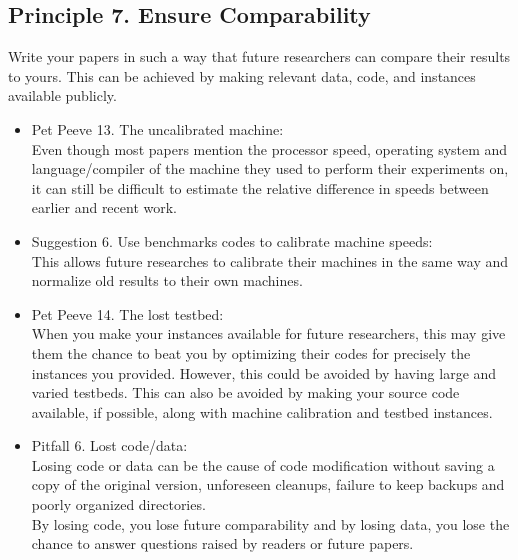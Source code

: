\documentclass[]{scrartcl}
\begin{document}
\subsection*{Principle 7. Ensure Comparability}
Write your papers in such a way that future researchers can compare their results to yours. This can be achieved by making relevant data, code, and instances available publicly.
\begin{itemize}
	\item Pet Peeve 13. The uncalibrated machine: \\
	Even though most papers mention the processor speed, operating system and language/compiler of the machine they used to perform their experiments on, it can still be difficult to estimate the relative difference in speeds between earlier and recent work. 
	\item Suggestion 6. Use benchmarks codes to calibrate machine speeds: \\
	This allows future researches to calibrate their machines in the same way and normalize old results to their own machines.
	\item Pet Peeve 14. The lost testbed: \\
	When you make your instances available for future researchers, this may give them the chance to beat you by optimizing their codes for precisely the instances you provided. However, this could be avoided by having large and varied testbeds. This can also be avoided by making your source code available, if possible, along with machine calibration and testbed instances.
	\item Pitfall 6. Lost code/data: \\
	Losing code or data can be the cause of code modification without saving a copy of the original version, unforeseen cleanups, failure to keep backups and poorly organized directories. \\ By losing code, you lose future comparability and by losing data, you lose the chance to answer questions raised by readers or future papers.
\end{itemize}
\end{document}

